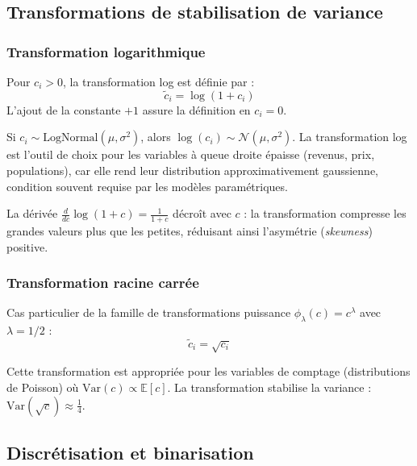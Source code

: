 \documentclass[12pt,a4paper]{article}
\newcounter{defcount}[section]
\newcounter{propcount}[section]
\newenvironment{definition}[1]{%
  \stepcounter{defcount}%
  \begin{tcolorbox}[defstyle={Définition \thesection.\thedefcount\ — #1}]
}{%
  \end{tcolorbox}
}
\newenvironment{proposition}[1]{%
  \stepcounter{propcount}%
  \begin{tcolorbox}[propstyle={Proposition \thesection.\thepropcount\ — #1}]
}{%
  \end{tcolorbox}
}
\begin{document}
\subsection{Transformations de stabilisation de variance}

\subsubsection{Transformation logarithmique}

\begin{definition}{Transformation log (Box-Cox, $\lambda=0$)}
Pour $c_i > 0$, la transformation log est définie par :
\begin{equation}
  \tilde{c}_i = \log(1 + c_i)
\end{equation}
L'ajout de la constante $+1$ assure la définition en $c_i = 0$.
\end{definition}

\begin{proposition}{Stabilisation de variance}
Si $c_i \sim \text{LogNormal}(\mu, \sigma^2)$, alors
$\log(c_i) \sim \mathcal{N}(\mu, \sigma^2)$.
La transformation log est l'outil de choix pour les variables à queue droite
épaisse (revenus, prix, populations), car elle rend leur distribution
approximativement gaussienne, condition souvent requise par les modèles
paramétriques.
\end{proposition}

La dérivée $\frac{d}{dc}\log(1+c) = \frac{1}{1+c}$ décroît avec $c$ :
la transformation compresse les grandes valeurs plus que les petites,
réduisant ainsi l'asymétrie (\textit{skewness}) positive.

\subsubsection{Transformation racine carrée}

Cas particulier de la famille de transformations puissance
$\phi_\lambda(c) = c^\lambda$ avec $\lambda = 1/2$ :
\begin{equation}
  \tilde{c}_i = \sqrt{c_i}
\end{equation}

Cette transformation est appropriée pour les variables de comptage
(distributions de Poisson) où $\text{Var}(c) \propto \mathbb{E}[c]$.
La transformation stabilise la variance : $\text{Var}(\sqrt{c}) \approx \frac{1}{4}$.

\subsection{Discrétisation et binarisation}
\end{document}
